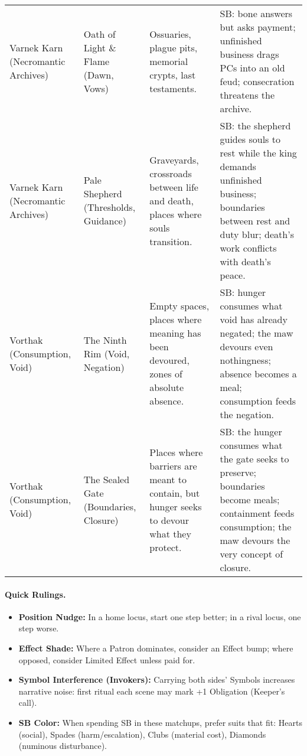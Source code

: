 \begin{longtable}{@{}p{3.3cm}p{3.3cm}p{4.6cm}p{7.2cm}@{}}
Varnek Karn (Necromantic Archives) & Oath of Light \& Flame (Dawn, Vows) &
Ossuaries, plague pits, memorial crypts, last testaments. &
SB: bone answers but asks payment; unfinished business drags PCs into an old feud; consecration threatens the archive. \\

Varnek Karn (Necromantic Archives) & Pale Shepherd (Thresholds, Guidance) &
Graveyards, crossroads between life and death, places where souls transition. &
SB: the shepherd guides souls to rest while the king demands unfinished business; boundaries between rest and duty blur; death's work conflicts with death's peace. \\

Vorthak (Consumption, Void) & The Ninth Rim (Void, Negation) &
Empty spaces, places where meaning has been devoured, zones of absolute absence. &
SB: hunger consumes what void has already negated; the maw devours even nothingness; absence becomes a meal; consumption feeds the negation. \\

Vorthak (Consumption, Void) & The Sealed Gate (Boundaries, Closure) &
Places where barriers are meant to contain, but hunger seeks to devour what they protect. &
SB: the hunger consumes what the gate seeks to preserve; boundaries become meals; containment feeds consumption; the maw devours the very concept of closure. \\

\bottomrule
\end{longtable}

  

\paragraph{Quick Rulings.}
\begin{itemize}
  \item \textbf{Position Nudge:} In a home locus, start one step better; in a rival locus, one step worse.
  \item \textbf{Effect Shade:} Where a Patron dominates, consider an Effect bump; where opposed, consider Limited Effect unless paid for.
  \item \textbf{Symbol Interference (Invokers):} Carrying both sides’ Symbols increases narrative noise: first ritual each scene may mark +1 Obligation (Keeper’s call).
  \item \textbf{SB Color:} When spending SB in these matchups, prefer suits that fit: Hearts (social), Spades (harm/escalation), Clubs (material cost), Diamonds (numinous disturbance).
\end{itemize}

